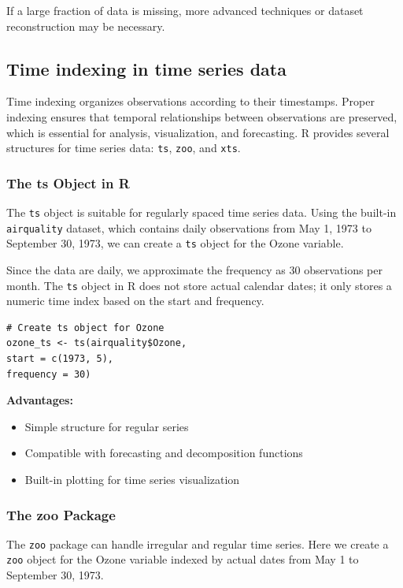\documentclass[12pt,a4paper]{article}
\begin{document}
If a large fraction of data is missing, more advanced techniques or dataset reconstruction may be necessary.

\subsection{Time indexing in time series data}

Time indexing organizes observations according to their timestamps. Proper indexing ensures that temporal relationships between observations are preserved, which is essential for analysis, visualization, and forecasting. R provides several structures for time series data: \texttt{ts}, \texttt{zoo}, and \texttt{xts}.

\subsubsection{The ts Object in R}

The \texttt{ts} object is suitable for regularly spaced time series data. Using the built-in \texttt{airquality} dataset, which contains daily observations from May 1, 1973 to September 30, 1973, we can create a \texttt{ts} object for the Ozone variable.

Since the data are daily, we approximate the frequency as 30 observations per month. The \texttt{ts} object in R does not store actual calendar dates; it only stores a numeric time index based on the start and frequency.

\begin{verbatim}
# Create ts object for Ozone
ozone_ts <- ts(airquality$Ozone,
start = c(1973, 5),
frequency = 30)
\end{verbatim}

\textbf{Advantages:}
\begin{itemize}
    \item Simple structure for regular series
    \item Compatible with forecasting and decomposition functions
    \item Built-in plotting for time series visualization
\end{itemize}

\subsubsection{The zoo Package}

The \texttt{zoo} package can handle irregular and regular time series. Here we create a \texttt{zoo} object for the Ozone variable indexed by actual dates from May 1 to September 30, 1973.
\end{document}

